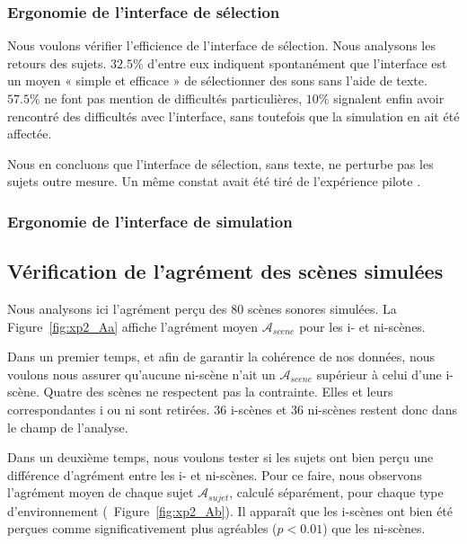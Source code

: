 \subsubsection{Ergonomie de l'interface de sélection}

Nous voulons vérifier l'efficience de l'interface de sélection. Nous analysons les retours des sujets. $32.5\%$ d'entre eux indiquent spontanément que l'interface est un moyen « simple et efficace » de sélectionner des sons sans l'aide de texte. $57.5\%$ ne font pas mention de difficultés particulières, $10\%$ signalent enfin avoir rencontré des difficultés avec l'interface, sans toutefois que la simulation en ait été affectée.

Nous en concluons que l'interface de sélection, sans texte, ne perturbe pas les sujets outre mesure. Un même constat avait été tiré de l'expérience pilote \citep{lafay2013atiam,lafay2014new}. 

\subsubsection{Ergonomie de l'interface de simulation}


\subsection{Vérification de l'agrément des scènes simulées}

Nous analysons ici l'agrément perçu des $80$ scènes sonores simulées. La Figure~\ref{fig:xp2_Aa} affiche l'agrément moyen $\mathcal{A}_{scene}$ pour les i- et ni-scènes. 

Dans un premier temps, et afin de garantir la cohérence de nos données, nous voulons nous assurer qu'aucune ni-scène n'ait un $\mathcal{A}_{scene}$ supérieur à celui d'une i-scène. Quatre des scènes ne respectent pas la contrainte. Elles et leurs correspondantes i ou ni sont retirées. 36 i-scènes et 36 ni-scènes restent donc dans le champ de l'analyse.

Dans un deuxième temps, nous voulons tester si les sujets ont bien perçu une différence d'agrément entre les i- et ni-scènes. Pour ce faire, nous observons l'agrément moyen de chaque sujet $\mathcal{A}_{sujet}$, calculé séparément, pour chaque type d'environnement (\cf~Figure~\ref{fig:xp2_Ab}). Il apparaît que les i-scènes ont bien été perçues comme significativement plus agréables ($p<0.01$) que les ni-scènes.

